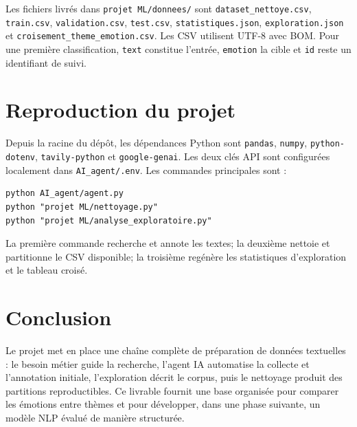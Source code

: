 \documentclass[11pt,a4paper]{article}
\begin{document}
Les fichiers livrés dans \texttt{projet ML/donnees/} sont \texttt{dataset\_nettoye.csv}, \texttt{train.csv}, \texttt{validation.csv}, \texttt{test.csv}, \texttt{statistiques.json}, \texttt{exploration.json} et \texttt{croisement\_theme\_emotion.csv}. Les CSV utilisent UTF-8 avec BOM. Pour une première classification, \texttt{text} constitue l'entrée, \texttt{emotion} la cible et \texttt{id} reste un identifiant de suivi.

\section{Reproduction du projet}
Depuis la racine du dépôt, les dépendances Python sont \texttt{pandas}, \texttt{numpy}, \texttt{python-dotenv}, \texttt{tavily-python} et \texttt{google-genai}. Les deux clés API sont configurées localement dans \texttt{AI\_agent/.env}. Les commandes principales sont :
\begin{verbatim}
python AI_agent/agent.py
python "projet ML/nettoyage.py"
python "projet ML/analyse_exploratoire.py"
\end{verbatim}
La première commande recherche et annote les textes; la deuxième nettoie et partitionne le CSV disponible; la troisième regénère les statistiques d'exploration et le tableau croisé.

\section*{Conclusion}
Le projet met en place une chaîne complète de préparation de données textuelles : le besoin métier guide la recherche, l'agent IA automatise la collecte et l'annotation initiale, l'exploration décrit le corpus, puis le nettoyage produit des partitions reproductibles. Ce livrable fournit une base organisée pour comparer les émotions entre thèmes et pour développer, dans une phase suivante, un modèle NLP évalué de manière structurée.
\end{document}
